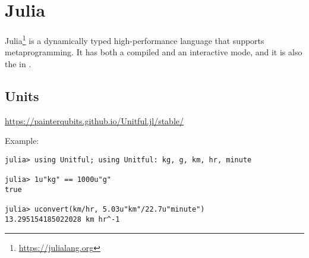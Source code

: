 \section{Julia}
\label{lang:julia}

Julia\footnote{\url{https://julialang.org}} is a dynamically typed high-performance language that supports metaprogramming. It has both a compiled and an interactive mode, and it is also the  in .

\subsection{Units}

\url{https://painterqubits.github.io/Unitful.jl/stable/}

Example:
\begin{verbatim}
julia> using Unitful; using Unitful: kg, g, km, hr, minute

julia> 1u"kg" == 1000u"g"
true

julia> uconvert(km/hr, 5.03u"km"/22.7u"minute")
13.295154185022028 km hr^-1
\end{verbatim}

